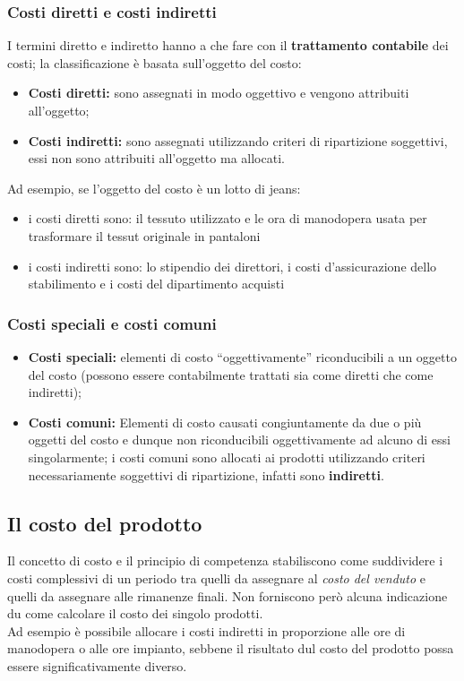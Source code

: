 \documentclass{article}
\begin{document}
\subsubsection{Costi diretti e costi indiretti}
I termini diretto e indiretto hanno a che fare con il \textbf{trattamento contabile} dei costi; la classificazione è basata sull'oggetto del costo:
\begin{itemize}
    \item \textbf{Costi diretti:} sono assegnati in modo oggettivo e vengono attribuiti all'oggetto;
    \item  \textbf{Costi indiretti:} sono assegnati utilizzando criteri di ripartizione soggettivi, essi non sono attribuiti all'oggetto ma allocati.
\end{itemize}
Ad esempio, se l'oggetto del costo è un lotto di jeans:
\begin{itemize}
    \item i costi diretti sono: il tessuto utilizzato e le ora di manodopera usata per trasformare il tessut originale in pantaloni
    \item i costi indiretti sono: lo stipendio dei direttori, i costi d'assicurazione dello stabilimento e i costi del dipartimento acquisti 
\end{itemize}


\subsubsection{Costi speciali e costi comuni}
\begin{itemize}
    \item \textbf{Costi speciali:} elementi di costo “oggettivamente” riconducibili a un oggetto del costo
    (possono essere contabilmente trattati sia come diretti che come indiretti);
    \item \textbf{Costi comuni:} Elementi di costo causati congiuntamente da due o più oggetti del costo e dunque non riconducibili oggettivamente ad alcuno di essi singolarmente; i costi comuni sono allocati ai prodotti utilizzando criteri necessariamente soggettivi di ripartizione, infatti sono \textbf{indiretti}.
\end{itemize}



\subsection{Il costo del prodotto}
Il concetto di costo e il principio di competenza stabiliscono come suddividere i costi complessivi di un periodo tra quelli da assegnare al \textit{costo del venduto} e quelli da assegnare alle rimanenze finali. Non forniscono però alcuna indicazione du come calcolare il costo dei singolo prodotti.\\
Ad esempio è possibile allocare i costi indiretti in proporzione alle ore di manodopera o alle ore impianto, sebbene il risultato dul costo del prodotto possa essere significativamente diverso.
\end{document}
